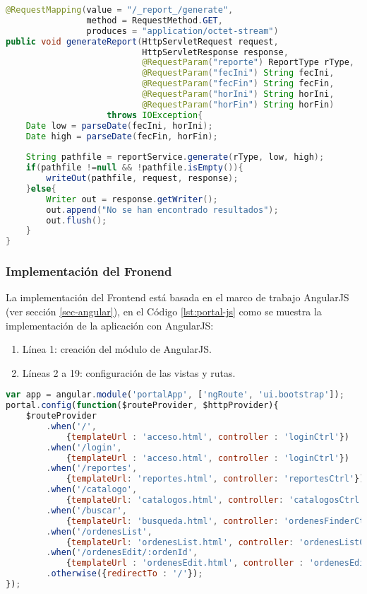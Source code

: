 \begin{enumerate}
\begin{lstlisting}[language=Java, caption={Servicio Web para generar un reporte.}, captionpos=b, label={lst:report-controller-gen}]
@RequestMapping(value = "/_report_/generate",
				method = RequestMethod.GET,
				produces = "application/octet-stream")
public void generateReport(HttpServletRequest request,
						   HttpServletResponse response,
						   @RequestParam("reporte") ReportType rType,
						   @RequestParam("fecIni") String fecIni,
						   @RequestParam("fecFin") String fecFin,
						   @RequestParam("horIni") String horIni,
						   @RequestParam("horFin") String horFin)
					throws IOException{
	Date low = parseDate(fecIni, horIni);
	Date high = parseDate(fecFin, horFin);
	
	String pathfile = reportService.generate(rType, low, high);
	if(pathfile !=null && !pathfile.isEmpty()){
		writeOut(pathfile, request, response);
	}else{
		Writer out = response.getWriter();
		out.append("No se han encontrado resultados");
		out.flush();
	}
}
\end{lstlisting}

\end{enumerate}


\subsubsection{Implementación del Fronend}
La implementación del Frontend está basada en el marco de trabajo AngularJS (ver sección \ref{sec-angular}), en el Código \ref{lst:portal-js} como se muestra la implementación de la aplicación con AngularJS:
\begin{enumerate}
	\item Línea 1: creación del módulo de AngularJS.
	\item Líneas 2 a 19: configuración de las vistas y rutas.
\end{enumerate}
\begin{lstlisting}[language=Javascript, caption={Módulo de AngularJS para el portalWeb}, captionpos=b, label={lst:portal-js}]
var app = angular.module('portalApp', ['ngRoute', 'ui.bootstrap']);
portal.config(function($routeProvider, $httpProvider){
	$routeProvider
		.when('/',
			{templateUrl : 'acceso.html', controller : 'loginCtrl'})
		.when('/login',
			{templateUrl : 'acceso.html', controller : 'loginCtrl'})
		.when('/reportes',
			{templateUrl: 'reportes.html', controller: 'reportesCtrl'})
		.when('/catalogo',
			{templateUrl: 'catalogos.html', controller: 'catalogosCtrl'})
		.when('/buscar',
			{templateUrl: 'busqueda.html', controller: 'ordenesFinderCtrl'})
		.when('/ordenesList',
			{templateUrl: 'ordenesList.html', controller: 'ordenesListCtrl'})
		.when('/ordenesEdit/:ordenId',
			{templateUrl : 'ordenesEdit.html', controller : 'ordenesEditCtrl'})
		.otherwise({redirectTo : '/'});
});
\end{lstlisting}


